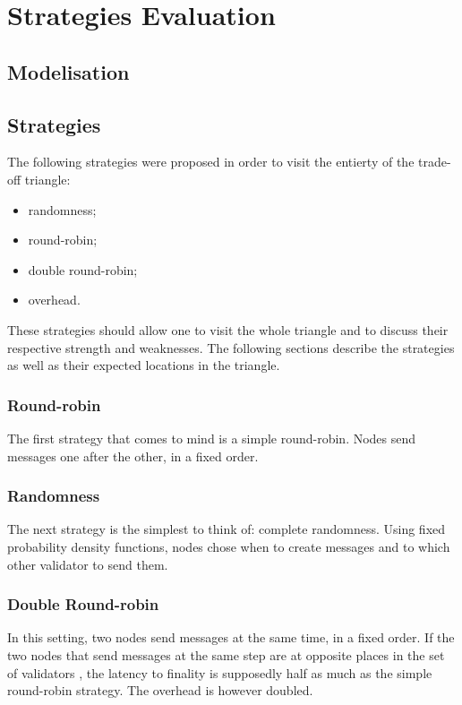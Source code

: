 \chapter{Strategies Evaluation}
\label{chap:strategies}

\section{Modelisation}
\section{Strategies}
The following strategies were proposed in order to visit the entierty of the
trade-off triangle:
\begin{itemize}
        \item randomness;
        \item round-robin;
        \item double round-robin;
        \item overhead.
\end{itemize}
These strategies should allow one to visit the whole triangle and to discuss
their respective strength and weaknesses. The following sections describe the
strategies as well as their expected locations in the triangle.

\subsection{Round-robin}
The first strategy that comes to mind is a simple round-robin. Nodes send
messages one after the other, in a fixed order.

\subsection{Randomness}
The next strategy is the simplest to think of: complete randomness. Using fixed
probability density functions, nodes chose when to create messages and to which
other validator to send them.

\subsection{Double Round-robin}
In this setting, two nodes send messages at the same time, in a fixed order. If
the two nodes that send messages at the same step are at opposite places in the
set of validators , the latency to finality is supposedly
half as much as the simple round-robin strategy. The overhead is however
doubled.

